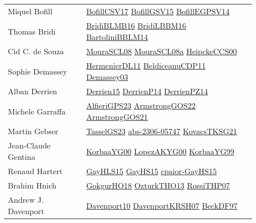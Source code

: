 {\begin{longtable}{p{4cm}p{20cm}}
Miquel Bofill & \href{papers/BofillCSV17.pdf}{BofillCSV17}\cite{BofillCSV17} \href{papers/BofillGSV15.pdf}{BofillGSV15}\cite{BofillGSV15} \href{papers/BofillEGPSV14.pdf}{BofillEGPSV14}\cite{BofillEGPSV14} \\
Thomas Bridi & \href{articles/BridiBLMB16.pdf}{BridiBLMB16}\cite{BridiBLMB16} \href{papers/BridiLBBM16.pdf}{BridiLBBM16}\cite{BridiLBBM16} \href{papers/BartoliniBBLM14.pdf}{BartoliniBBLM14}\cite{BartoliniBBLM14} \\
Cid C. de Souza & \href{papers/MouraSCL08.pdf}{MouraSCL08}\cite{MouraSCL08} \href{papers/MouraSCL08a.pdf}{MouraSCL08a}\cite{MouraSCL08a} \href{articles/HeipckeCCS00.pdf}{HeipckeCCS00}\cite{HeipckeCCS00} \\
Sophie Demassey & \href{papers/HermenierDL11.pdf}{HermenierDL11}\cite{HermenierDL11} \href{articles/BeldiceanuCDP11.pdf}{BeldiceanuCDP11}\cite{BeldiceanuCDP11} \href{}{Demassey03}\cite{Demassey03} \\
Alban Derrien & \href{}{Derrien15}\cite{Derrien15} \href{papers/DerrienP14.pdf}{DerrienP14}\cite{DerrienP14} \href{papers/DerrienPZ14.pdf}{DerrienPZ14}\cite{DerrienPZ14} \\
Michele Garraffa & \href{articles/AlfieriGPS23.pdf}{AlfieriGPS23}\cite{AlfieriGPS23} \href{papers/ArmstrongGOS22.pdf}{ArmstrongGOS22}\cite{ArmstrongGOS22} \href{papers/ArmstrongGOS21.pdf}{ArmstrongGOS21}\cite{ArmstrongGOS21} \\
Martin Gebser & \href{papers/TasselGS23.pdf}{TasselGS23}\cite{TasselGS23} \href{articles/abs-2306-05747.pdf}{abs-2306-05747}\cite{abs-2306-05747} \href{papers/KovacsTKSG21.pdf}{KovacsTKSG21}\cite{KovacsTKSG21} \\
Jean{-}Claude Gentina & \href{articles/KorbaaYG00.pdf}{KorbaaYG00}\cite{KorbaaYG00} \href{articles/LopezAKYG00.pdf}{LopezAKYG00}\cite{LopezAKYG00} \href{papers/KorbaaYG99.pdf}{KorbaaYG99}\cite{KorbaaYG99} \\
Renaud Hartert & \href{papers/GayHLS15.pdf}{GayHLS15}\cite{GayHLS15} \href{papers/GayHS15.pdf}{GayHS15}\cite{GayHS15} \href{papers/cpaior-GayHS15.pdf}{cpaior-GayHS15}\cite{cpaior-GayHS15} \\
Brahim Hnich & \href{}{GokgurHO18}\cite{GokgurHO18} \href{articles/OzturkTHO13.pdf}{OzturkTHO13}\cite{OzturkTHO13} \href{papers/RossiTHP07.pdf}{RossiTHP07}\cite{RossiTHP07} \\
Andrew J. Davenport & \href{papers/Davenport10.pdf}{Davenport10}\cite{Davenport10} \href{papers/DavenportKRSH07.pdf}{DavenportKRSH07}\cite{DavenportKRSH07} \href{papers/BeckDF97.pdf}{BeckDF97}\cite{BeckDF97} \\

\end{longtable}}
